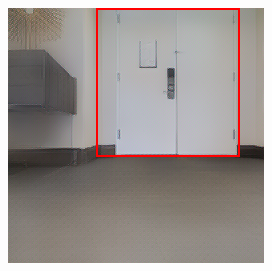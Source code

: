 \begin{figure}[h!]
\begin{subfigure}[b]{\linewidth}
\begin{subfigure}[b]{0.32\linewidth}
		\end{subfigure}
		\hfil
		\begin{subfigure}[b]{0.32\linewidth}
			\includegraphics[width=\textwidth]{images/wrong_box_box_1.png}
		\end{subfigure}
		

\end{subfigure}
\end{figure}
